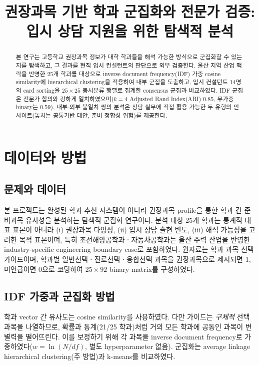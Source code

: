 \documentclass[conference]{IEEEtran}
\title{권장과목 기반 학과 군집화와 전문가 검증: 입시 상담 지원을 위한 탐색적 분석}
\author{
  \IEEEauthorblockN{박재우}
  \IEEEauthorblockA{NOVA50301 Term Project --- Progress Report}
}
\begin{document}
\maketitle

\begin{abstract}
본 연구는 고등학교 권장과목 정보가 대학 학과들을 해석 가능한 방식으로 군집화할 수 있는지를 탐색하고, 그 결과를 현직 입시 컨설턴트의 판단으로 외부 검증한다.
울산 지역 산업 맥락을 반영한 25개 학과를 대상으로 inverse document frequency(IDF) 가중 cosine similarity에 hierarchical clustering을 적용하여 내부 군집을 도출하고, 입시 컨설턴트 14명의 card sorting을 $25\times25$ 동시분류 행렬로 집계한 consensus 군집과 비교하였다.
IDF 군집은 전문가 합의와 강하게 일치하였으며($k=4$ Adjusted Rand Index(ARI) $0.85$, 무가중 binary는 $0.59$), 내부-외부 불일치 쌍의 분석은 상담 실무에 직접 활용 가능한 두 유형의 인사이트(놓치는 공통기반 대안, 준비 정합성 위험)를 제공한다.
\end{abstract}

\section{데이터와 방법}

\subsection{문제와 데이터}

본 프로젝트는 완성된 학과 추천 시스템이 아니라 권장과목 profile을 통한 학과 간 준비과목 유사성을 분석하는 탐색적 군집화 연구이다.
분석 대상 25개 학과는 통계적 대표 표본이 아니라 (i) 권장과목 다양성, (ii) 입시 상담 출현 빈도, (iii) 해석 가능성을 고려한 목적 표본이며, 특히 조선해양공학과ㆍ자동차공학과는 울산 주력 산업을 반영한 industry-specific engineering boundary case로 포함하였다.
원자료는 학과 과목 선택 가이드이며, 학과별 일반선택ㆍ진로선택ㆍ융합선택 과목을 권장과목으로 제시되면 1, 미언급이면 0으로 코딩하여 $25\times92$ binary matrix를 구성하였다.

\subsection{IDF 가중과 군집화 방법}

학과 vector 간 유사도는 cosine similarity를 사용하였다.
다만 가이드는 \emph{구체적} 선택과목을 나열하므로, 확률과 통계(21/25 학과)처럼 거의 모든 학과에 공통인 과목이 변별력을 떨어뜨린다.
이를 보정하기 위해 각 과목을 inverse document frequency로 가중하였다($w=\ln(N/df)$, 별도 hyperparameter 없음).
군집화는 average linkage hierarchical clustering(주 방법)과 k-means를 비교하였다.
\end{document}
